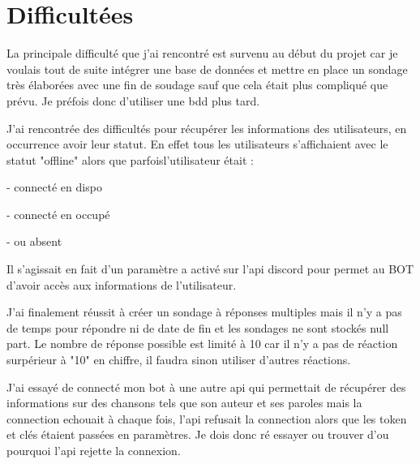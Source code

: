 \section{Difficultées}
    La principale difficulté que j'ai rencontré est survenu au début du projet car je voulais tout de
suite intégrer une base de données et mettre en place un sondage très élaborées avec une fin de soudage sauf que cela était plus compliqué que prévu.
    Je préfois donc d'utiliser une bdd plus tard.

    J'ai rencontrée des difficultés pour récupérer les informations des utilisateurs, en occurrence avoir leur statut. En effet tous les utilisateurs s'affichaient avec le statut "offline" alors que parfoisl'utilisateur était : 
    
        - connecté en dispo
        
        - connecté en occupé 
        
        - ou absent 
        
    Il s'agissait en fait d'un paramètre a activé sur l'api discord pour permet au BOT d'avoir accès aux informations de l'utilisateur. 
    
    J'ai finalement réussit à créer un sondage à réponses multiples mais il n'y a pas de temps pour répondre ni de date de fin et les sondages ne sont stockés null part. Le nombre de réponse possible est limité à 10 car il n'y a pas de réaction surpérieur à "10" en chiffre, il faudra sinon utiliser d'autres réactions.
    
    
    J'ai essayé de connecté mon bot à une autre api qui permettait de récupérer des informations sur des chansons tels que son auteur et ses paroles mais la connection echouait à chaque fois, l'api refusait la connection alors que les token et clés étaient passées en paramètres. 
    Je dois donc ré essayer ou trouver d'ou pourquoi l'api rejette la connexion. 
    
